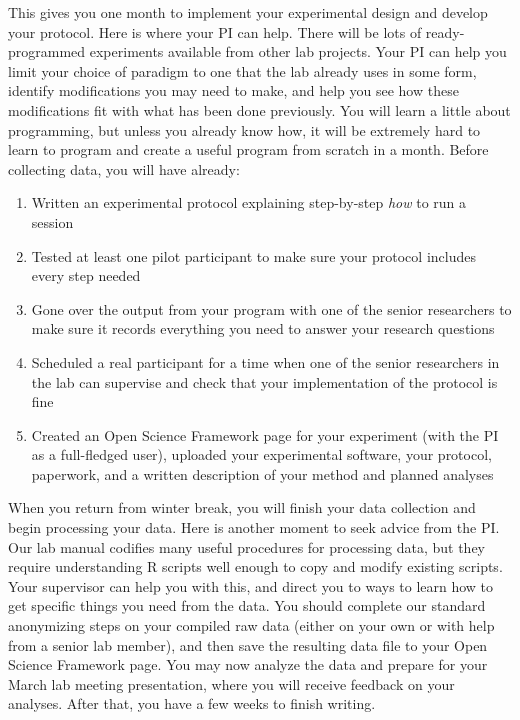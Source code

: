 \documentclass[
  12pt,
]{book}
\providecommand{\tightlist}{%
  \setlength{\itemsep}{0pt}\setlength{\parskip}{0pt}}
\begin{document}
This gives you one month to implement your experimental design and develop your protocol. Here is where your PI can help. There will be lots of ready-programmed experiments available from other lab projects. Your PI can help you limit your choice of paradigm to one that the lab already uses in some form, identify modifications you may need to make, and help you see how these modifications fit with what has been done previously. You will learn a little about programming, but unless you already know how, it will be extremely hard to learn to program and create a useful program from scratch in a month. Before collecting data, you will have already:

\begin{enumerate}
\def\labelenumi{\arabic{enumi}.}
\tightlist
\item
  Written an experimental protocol explaining step-by-step \emph{how} to run a session
\item
  Tested at least one pilot participant to make sure your protocol includes every step needed
\item
  Gone over the output from your program with one of the senior researchers to make sure it records everything you need to answer your research questions
\item
  Scheduled a real participant for a time when one of the senior researchers in the lab can supervise and check that your implementation of the protocol is fine
\item
  Created an Open Science Framework page for your experiment (with the PI as a full-fledged user), uploaded your experimental software, your protocol, paperwork, and a written description of your method and planned analyses
\end{enumerate}

When you return from winter break, you will finish your data collection and begin processing your data. Here is another moment to seek advice from the PI. Our lab manual codifies many useful procedures for processing data, but they require understanding R scripts well enough to copy and modify existing scripts. Your supervisor can help you with this, and direct you to ways to learn how to get specific things you need from the data. You should complete our standard anonymizing steps on your compiled raw data (either on your own or with help from a senior lab member), and then save the resulting data file to your Open Science Framework page. You may now analyze the data and prepare for your March lab meeting presentation, where you will receive feedback on your analyses. After that, you have a few weeks to finish writing.
\end{document}
